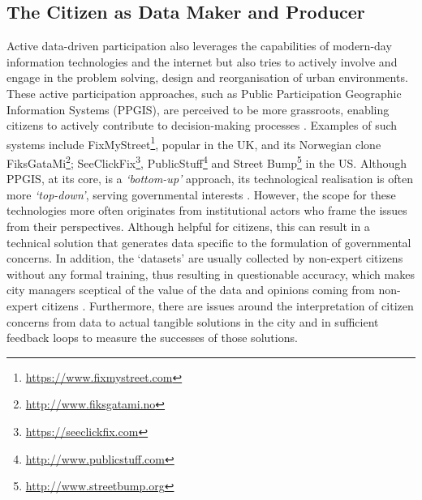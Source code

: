 \subsection{The Citizen as Data Maker and Producer}
\label{sub:data-maker}
Active data-driven participation also leverages the capabilities of modern-day information technologies and the internet but also tries to actively involve and engage in the problem solving, design and reorganisation of urban environments. These active participation approaches, such as Public Participation Geographic Information Systems (PPGIS), are perceived to be more grassroots, enabling citizens to actively contribute to decision-making processes \citep{sieber_public_2006,jankowski_towards_2009}. Examples of such systems include FixMyStreet\footnote{\url{https://www.fixmystreet.com}}, popular in the UK, and its Norwegian clone FiksGataMi\footnote{\url{http://www.fiksgatami.no}}; SeeClickFix\footnote{\url{https://seeclickfix.com}}, PublicStuff\footnote{\url{http://www.publicstuff.com}} and Street Bump\footnote{\url{http://www.streetbump.org}} in the US. Although PPGIS, at its core, is a \textit{`bottom-up'} approach, its technological realisation is often more \textit{`top-down'}, serving governmental interests \citep{tenney_data-driven_2016}. However, the scope for these technologies more often originates from institutional actors who frame the issues from their perspectives. Although helpful for citizens, this can result in a technical solution that generates data specific to the formulation of governmental concerns. In addition, the `datasets' are usually collected by non-expert citizens without any formal training, thus resulting in questionable accuracy, which makes city managers sceptical of the value of the data and opinions coming from non-expert citizens \citep{tenney_data-driven_2016}. Furthermore, there are issues around the interpretation of citizen concerns from data to actual tangible solutions in the city and in sufficient feedback loops to measure the successes of those solutions.


